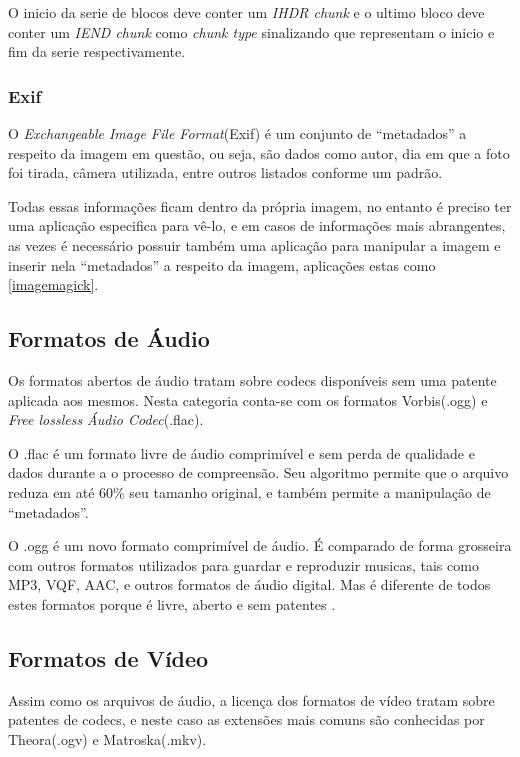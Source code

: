 O inicio da serie de blocos deve conter um \textit{IHDR chunk} e o ultimo bloco deve conter um \textit{IEND chunk} como \textit{chunk type} sinalizando que representam o inicio e fim da serie respectivamente.

\subsubsection{Exif}

O \textit{Exchangeable Image File Format}(Exif) é um conjunto de ``metadados'' a respeito da imagem em questão, ou seja, são dados como autor, dia em que a foto foi tirada, câmera utilizada, entre outros listados conforme um padrão.

Todas essas informações ficam dentro da própria imagem, no entanto é preciso ter uma aplicação especifica para vê-lo, e em casos de informações mais abrangentes, as vezes é necessário possuir também uma aplicação para manipular a imagem e inserir nela ``metadados'' a respeito da imagem, aplicações estas como \ref{imagemagick}.

\subsection{Formatos de Áudio}

Os formatos abertos de áudio tratam sobre codecs disponíveis sem uma patente aplicada aos mesmos. Nesta categoria conta-se com os formatos Vorbis(.ogg) e \textit{Free lossless Áudio Codec}(.flac).

O .flac é um formato livre de áudio comprimível e sem perda de qualidade e dados durante a o processo de compreensão. Seu algoritmo permite que o arquivo reduza em até 60\% seu tamanho original, e também permite a manipulação de ``metadados''.

O .ogg é um novo formato comprimível de áudio. 
É comparado de forma grosseira com outros formatos utilizados para guardar e reproduzir musicas, tais como MP3, VQF, AAC, e outros formatos de áudio digital. Mas é diferente de todos estes formatos porque é livre, aberto e sem patentes \cite{XIPH}.

\subsection{Formatos de Vídeo}

Assim como os arquivos de áudio, a licença dos formatos de vídeo tratam sobre patentes de codecs, e neste caso as extensões mais comuns são conhecidas por Theora(.ogv) e Matroska(.mkv).


